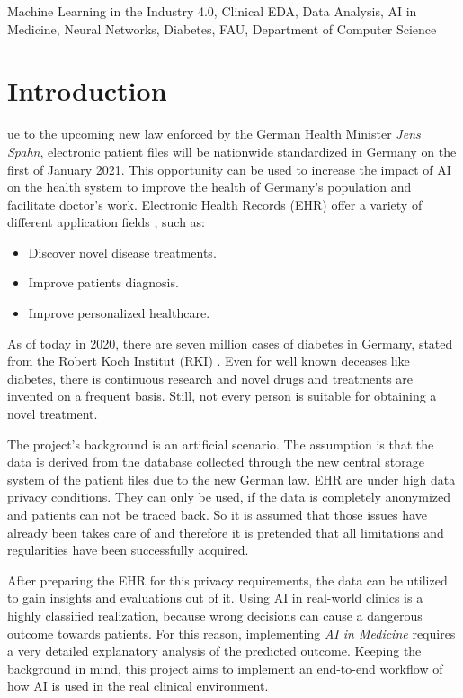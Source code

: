 \documentclass[journal]{IEEEtran}
\begin{document}
\begin{IEEEkeywords}
Machine Learning in the Industry 4.0, Clinical EDA, Data Analysis, AI in Medicine, Neural Networks, Diabetes, FAU, Department of Computer Science
\end{IEEEkeywords}

\IEEEpeerreviewmaketitle

\section{Introduction}
ue to the upcoming new law enforced by the German Health Minister \textit{Jens Spahn}, electronic patient files will be nationwide standardized in Germany \cite{spahn} on the first of January 2021. This opportunity can be used to increase the impact of AI on the health system to improve the health of Germany's population and facilitate doctor's work. Electronic Health Records (EHR) offer a variety of different application fields \cite{cite1} \cite{cite2}, such as: \\

\begin{itemize}
	\item Discover novel disease treatments.
	\item Improve patients diagnosis.
	\item Improve personalized healthcare. \\
\end{itemize}

As of today in 2020, there are seven million cases of diabetes in Germany, stated from the Robert Koch Institut (RKI) \cite{diab}.  Even for well known deceases like diabetes, there is continuous research and novel drugs and treatments are invented on a frequent basis. Still, not every person is suitable for obtaining a novel treatment. 

The project's background is an artificial scenario. The assumption is that the data is derived from the database collected through the new central storage system of the patient files due to the new German law. EHR are under high data privacy conditions. They can only be used, if the data is completely anonymized and patients can not be traced back. So it is assumed that those issues have already been takes care of and therefore it is pretended that all limitations and regularities have been successfully acquired.

After preparing the EHR for this privacy requirements, the data can be utilized to gain insights and evaluations out of it. Using AI in real-world clinics is a highly classified realization, because wrong decisions can cause a dangerous outcome towards patients. For this reason, implementing \textit{AI in Medicine} requires a very detailed explanatory analysis of the predicted outcome. Keeping the background in mind, this project aims to implement an end-to-end workflow of how AI is used in the real clinical environment. 
\end{document}
